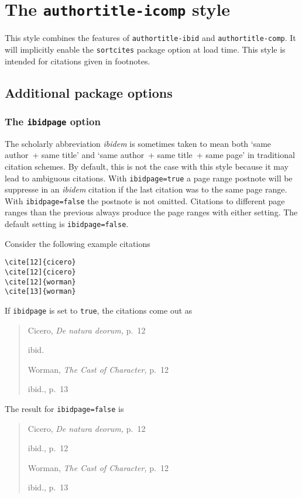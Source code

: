 \documentclass[a4paper]{article}
\begin{document}
\section*{The \texttt{authortitle-icomp} style}

This style combines the features of \texttt{authortitle-ibid} and
\texttt{authortitle-comp}. It will implicitly enable the
\texttt{sortcites} package option at load time. This style is
intended for citations given in footnotes.

\subsection*{Additional package options}

\subsubsection*{The \texttt{ibidpage} option}

The scholarly abbreviation \emph{ibidem} is sometimes taken to mean
both `same author~+ same title' and `same author~+ same title~+ same
page' in traditional citation schemes. By default, this is not the
case with this style because it may lead to ambiguous citations.
With \texttt{ibidpage=true} a page range postnote will be suppresse
in an \emph{ibidem} citation if the last citation was to the same
page range. With \texttt{ibidpage=false} the postnote is not omitted.
Citations to different page ranges than the previous always produce
the page ranges with either setting.
The default setting is \texttt{ibidpage=false}.

Consider the following example citations
\begin{verbatim}
\cite[12]{cicero}
\cite[12]{cicero}
\cite[12]{worman}
\cite[13]{worman}
\end{verbatim}
%
If \texttt{ibidpage} is set to \texttt{true}, the citations
come out as
\begin{quote}
Cicero, \emph{De natura deorum,} p.~12

ibid.

Worman, \emph{The Cast of Character,} p.~12

ibid., p.~13
\end{quote}
%
The result for \texttt{ibidpage=false} is
\begin{quote}
Cicero, \emph{De natura deorum,} p.~12

ibid., p.~12

Worman, \emph{The Cast of Character,} p.~12

ibid., p.~13
\end{quote}
\end{document}
